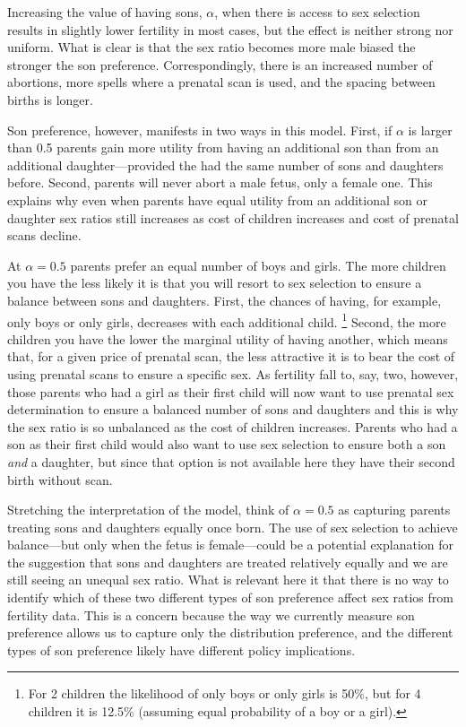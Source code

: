\documentclass[12pt,letterpaper]{article}
\begin{document}

Increasing the value of having sons, $\alpha$, when there is access to 
sex selection results in slightly lower fertility in most cases,
but the effect is neither strong nor uniform.
What is clear is that the sex ratio becomes more male biased 
the stronger the son preference.
Correspondingly, there is an increased number of abortions,
more spells where a prenatal scan is used,
and the spacing between births is longer.

Son preference, however, manifests in two ways in this model.
First, if $\alpha$ is larger than 0.5 parents gain more utility
from having an additional son than from an additional daughter---provided
the had the same number of sons and daughters before.
Second, parents will never abort a male fetus, only a female one.
This explains why even when parents have equal utility from an additional
son or daughter sex ratios still increases as cost of children 
increases and cost of prenatal scans decline.

At $\alpha = 0.5$ parents prefer an equal number of boys and girls.
The more children you have the less likely it is that you will
resort to sex selection to ensure a balance between sons and daughters.
First, the chances of having, for example, only boys or only
girls, decreases with each additional child.%
\footnote{
For 2 children the likelihood of only boys or only girls
is 50\%, but for 4 children it is 12.5\% (assuming equal probability
of a boy or a girl).
}
Second, the more children you have the lower the marginal
utility of having another, which means that, for a given price
of prenatal scan, the less attractive it is to bear the cost of using
prenatal scans to ensure a specific sex.
As fertility fall to, say, two, however, those parents who had a girl as their 
first child will now want to use prenatal sex determination to 
ensure a balanced number of sons and daughters and this is why
the sex ratio is so unbalanced as the cost of children increases.
Parents who had a son as their first child would also want to
use sex selection to ensure both a son \emph{and} a daughter, but since
that option is not available here they have their
second birth without scan.

Stretching the interpretation of the model, think of $\alpha=0.5$ 
as capturing parents treating sons and daughters equally once born.
The use of sex selection to achieve balance---but only when the
fetus is female---could be a potential explanation for the
suggestion that sons and daughters are treated relatively equally and 
we are still seeing an unequal sex ratio.
What is relevant here it that there is no way to identify which 
of these two different types of son preference affect sex ratios 
from fertility data.
This is a concern because the way we currently measure son preference
allows us to capture only the distribution preference, and 
the different types of son preference likely have different policy 
implications.
\end{document}
